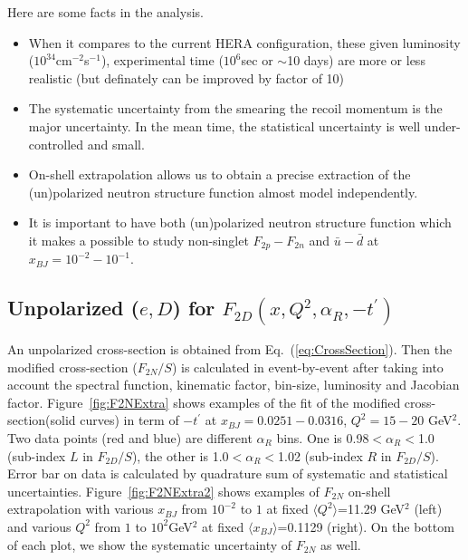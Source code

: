 \documentclass[12pt,letterpaper]{article}
\begin{document}
Here are some facts in the analysis. 
\begin{itemize}
\item When it compares to the current HERA configuration, these given luminosity ($10^{34}$cm$^{-2}$s$^{-1}$), experimental time ($10^{6}$sec or $\sim$10 days) are more or less realistic (but definately can be improved by factor of 10)
\item The systematic uncertainty from the smearing the recoil momentum is the major uncertainty. In the mean time, the statistical uncertainty is well under-controlled and small.
\item On-shell extrapolation allows us to obtain a precise extraction of the (un)polarized neutron structure function almost model independently.
\item It is important to have both (un)polarized neutron structure function which it makes a possible to study non-singlet $F_{2p}-F_{2n}$ and $\bar{u}-\bar{d}$ at $x_{BJ}=10^{-2} - 10^{-1}$.
\end{itemize}




\subsection{Unpolarized (${e}, {D}$) for $F_{2D}(x, Q^2, \alpha_R, -t^{\prime})$}
An unpolarized cross-section is obtained from Eq.~(\ref{eq:CrossSection}). Then the modified cross-section ($F_{2N}/S$) is calculated in event-by-event after taking into account the spectral function, kinematic factor, bin-size, luminosity and Jacobian factor. Figure~\ref{fig:F2NExtra} shows examples of the fit of the modified cross-section(solid curves) in term of $-t^{\prime}$ at $x_{BJ}=0.0251-0.0316$, $Q^2=15-20$ GeV$^2$. Two data points (red and blue) are different $\alpha_R$ bins. One is 0.98$<\alpha_R<$1.0 (sub-index $L$ in $F_{2D}/S$), the other is 1.0$<\alpha_R<$1.02 (sub-index $R$ in $F_{2D}/S$). Error bar on data is calculated by quadrature sum of systematic and statistical uncertainties. Figure~\ref{fig:F2NExtra2} shows examples of $F_{2N}$ on-shell extrapolation with various $x_{BJ}$ from $10^{-2}$ to $1$ at fixed $\langle Q^2 \rangle$=11.29 GeV$^2$ (left) and various $Q^2$ from $1$ to $10^2$GeV$^2$ at fixed $\langle x_{BJ} \rangle$=0.1129 (right). On the bottom of each plot, we show the systematic uncertainty of $F_{2N}$ as well.
\end{document}
